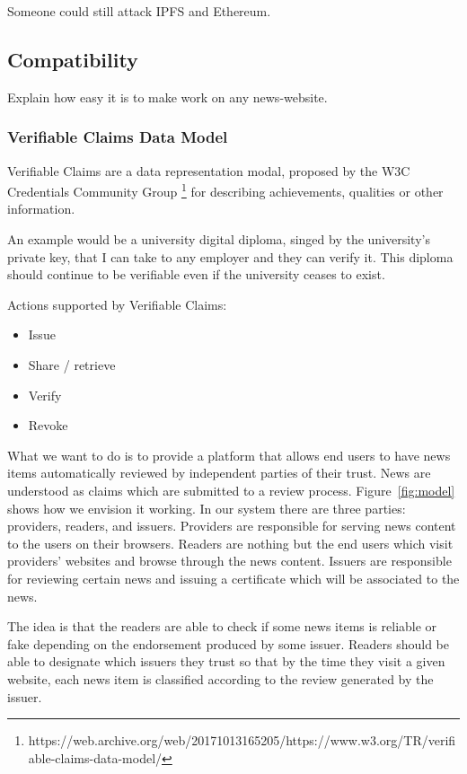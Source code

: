 Someone could still attack IPFS and Ethereum.

\subsection{Compatibility}
Explain how easy it is to make work on any news-website.

\subsubsection{Verifiable Claims Data Model}


Verifiable Claims are a data representation modal, proposed by the W3C Credentials Community Group \footnote{https://web.archive.org/web/20171013165205/https://www.w3.org/TR/verifiable-claims-data-model/} for describing achievements, qualities or other information.

An example would be a university digital diploma, singed by the university’s private key, that I can take to any employer and they can verify it. This diploma should continue to be verifiable even if the university ceases to exist.

Actions supported by Verifiable Claims:

\begin{itemize}
    \item Issue
    \item Share / retrieve
    \item Verify
    \item Revoke
\end{itemize}

What we want to do is to provide a platform that allows end users to have news items automatically reviewed by independent parties of their trust. News are understood as claims which are submitted to a review process. Figure~\ref{fig:model} shows how we envision it working. In our system there are three parties: providers, readers, and issuers. Providers are responsible for serving news content to the users on their browsers. Readers are nothing but the end users which visit providers' websites and browse through the news content. Issuers are responsible for reviewing certain news and issuing a certificate which will be associated to the news.

The idea is that the readers are able to check if some news items is reliable or fake depending on the endorsement produced by some issuer. Readers should be able to designate which issuers they trust so that by the time they visit a given website, each news item is classified according to the review generated by the issuer.

